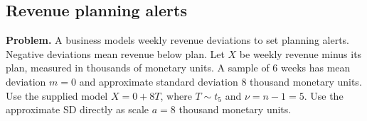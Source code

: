 
\clearpage
\subsection{Revenue planning alerts}
\label{c8-d6}
\textbf{Problem.} A business models weekly revenue deviations to set planning alerts. Negative deviations mean revenue below plan. Let $X$ be weekly revenue minus its plan, measured in thousands of monetary units. A sample of 6 weeks has mean deviation $m=0$ and approximate standard deviation $8$ thousand monetary units. Use the supplied model $X=0+8T$, where $T\sim t_{5}$ and $\nu=n-1=5$. Use the approximate SD directly as scale $a=8$ thousand monetary units.
